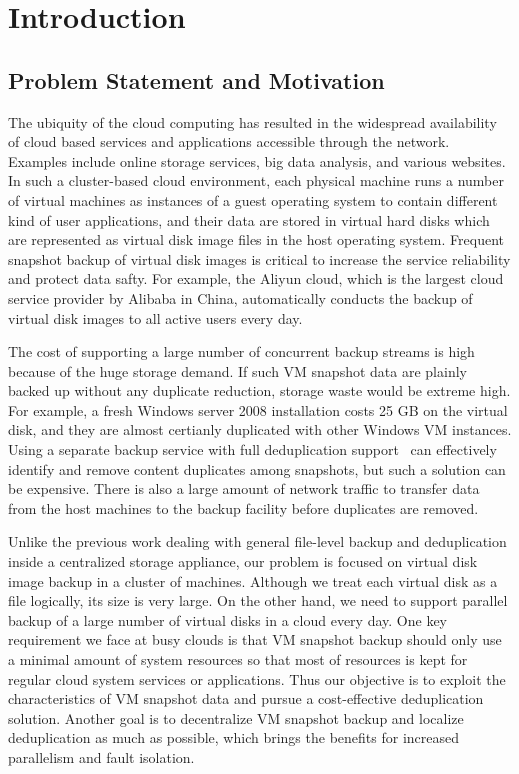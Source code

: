 \chapter{Introduction}
\label{chap:intro}
\section{Problem Statement and Motivation}
\label{intro:prob}
The ubiquity of the cloud computing has resulted in the 
widespread availability of cloud based services and applications accessible through 
the network. Examples include online storage services, big data analysis, and various websites.
In such a cluster-based cloud environment,
each physical machine runs a number of virtual machines as  instances of a guest operating system 
to contain different kind of user applications,
and their data are stored in virtual hard disks which are represented 
as virtual disk image files in the host operating system.
Frequent snapshot backup of virtual disk images is critical to increase  the service reliability
and protect data safty.
For example, the Aliyun cloud, which is  the largest cloud service provider by Alibaba in China, 
automatically conducts  the backup of virtual disk images to all active users every day.

The cost of supporting a large number of concurrent backup streams is high
because of the huge storage demand. 
If such VM snapshot data are plainly backed up without any duplicate reduction, storage waste would be 
extreme high. For example, a fresh Windows server 2008 installation costs 25 GB on the virtual disk,
and they are almost certianly duplicated with other Windows VM instances\cite{common07, pedal96}.
Using a separate  backup service with full deduplication support~\cite{venti02,bottleneck08}
can effectively identify and remove content duplicates among snapshots, 
but such a solution can be expensive. There is also a large amount of 
network traffic to transfer  data from the host machines to the backup facility
before duplicates are removed.

Unlike the previous work dealing with general file-level
backup and deduplication inside a centralized storage appliance, our problem is focused on virtual
disk image backup in a cluster of machines. Although we treat each virtual disk as a
file logically, its size is very large. On the other hand, we need
to support parallel backup of a large number of virtual disks
in a cloud every day. One key requirement we face at busy clouds
 is that VM snapshot backup should only use a minimal
amount of system resources so that most of resources is kept
for regular cloud system services or applications. Thus our
objective is to exploit the characteristics of VM snapshot data
and pursue a cost-effective deduplication solution. Another
goal is to decentralize VM snapshot backup and localize
deduplication as much as possible, which brings the benefits
for increased parallelism and fault isolation.

